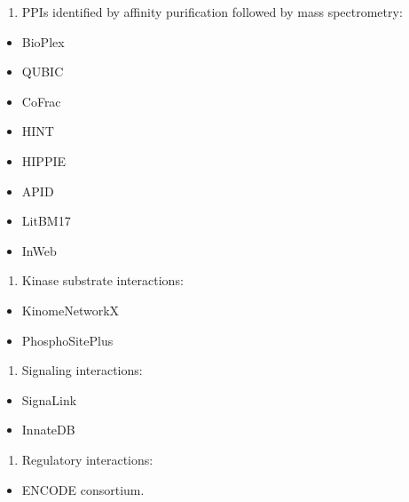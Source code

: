 \documentclass[
]{book}
\providecommand{\tightlist}{%
  \setlength{\itemsep}{0pt}\setlength{\parskip}{0pt}}
\begin{document}
\begin{enumerate}
\def\labelenumi{\arabic{enumi}.}
\setcounter{enumi}{3}
\tightlist
\item
  PPIs identified by affinity purification followed by mass spectrometry:
\end{enumerate}

\begin{itemize}
\tightlist
\item
  BioPlex \citep{Huttlin2017}
\item
  QUBIC \citep{Hein2015}
\item
  CoFrac \citep{wan2015}
\item
  HINT
\item
  HIPPIE
\item
  APID
\item
  LitBM17
\item
  InWeb
\end{itemize}

\begin{enumerate}
\def\labelenumi{\arabic{enumi}.}
\setcounter{enumi}{4}
\tightlist
\item
  Kinase substrate interactions:
\end{enumerate}

\begin{itemize}
\tightlist
\item
  KinomeNetworkX \citep{cheng2014}
\item
  PhosphoSitePlus \citep{Hornbeck2015}
\end{itemize}

\begin{enumerate}
\def\labelenumi{\arabic{enumi}.}
\setcounter{enumi}{5}
\tightlist
\item
  Signaling interactions:
\end{enumerate}

\begin{itemize}
\tightlist
\item
  SignaLink \citep{Fazekas2013}
\item
  InnateDB \citep{Breuer2013}
\end{itemize}

\begin{enumerate}
\def\labelenumi{\arabic{enumi}.}
\setcounter{enumi}{6}
\tightlist
\item
  Regulatory interactions:
\end{enumerate}

\begin{itemize}
\tightlist
\item
  ENCODE consortium.
\end{itemize}
\end{document}
